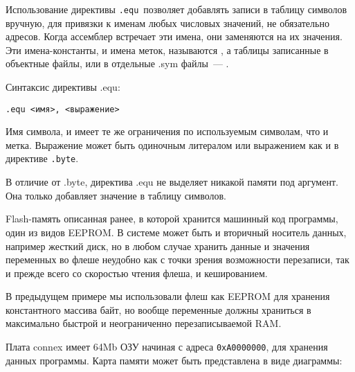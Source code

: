 Использование директивы \verb|.equ|\ позволяет добавлять записи в
таблицу символов вручную, для привязки к именам любых числовых значений, не
обязательно адресов. Когда ассемблер встречает эти имена, они заменяются на их
значения. Эти имена-константы, и имена меток, называются
, а таблицы записанные в объектные файлы, или в
отдельные .sym файлы\ --- .

Синтаксис директивы .equ:

\begin{verbatim}
.equ <имя>, <выражение>
\end{verbatim}

Имя символа, и имеет те же ограничения по используемым символам, что и метка.
Выражение может быть одиночным литералом или выражением как и в директиве
\verb|.byte|.

\begin{framed}
В отличие от .byte, директива .equ не выделяет никакой памяти под аргумент.
Она только добавляет значение в таблицу символов.  
\end{framed}

\secup

\secup
{}

Flash-память описанная ранее, в которой хранится машинный код программы, один из
видов EEPROM.
В системе может быть и вторичный носитель данных, например жесткий диск, но в
любом случае хранить данные и значения переменных во флеше неудобно как с точки
зрения возможности перезаписи, так и прежде всего со скоростью чтения флеша, и
кешированием.

В предыдущем примере мы использовали флеш как EEPROM для хранения константного
массива байт, но вообще переменные должны храниться в максимально быстрой и
неограниченно перезаписываемой RAM.

Плата connex имеет 64Mb ОЗУ начиная с адреса \verb|0xA0000000|, для хранения
данных программы. Карта памяти может быть представлена в виде диаграммы:



